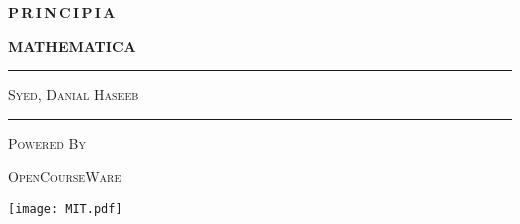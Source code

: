 \documentclass[../main]{subfiles}
\begin{document}
\begin{titlingpage}
  {\Huge \textbf{P\,R\,I\,N\,C\,I\,P\,I\,A}}
  
  \vspace*{\parskip}

  {
    \huge
    \textbf{MATHEMATICA}}\\[\parskip]
    \rule{\textwidth}{\heavyrulewidth
  }
  \vspace*{2em}

  \color{MITgray} {\LARGE \textsc{Syed, Danial Haseeb}}

  \vfill

  \rule{\textwidth}{\normalrulethickness}
  
  {\large \textsc{Powered By}}
  \vspace{1em}
  
  \color{MITred} \textsc{OpenCourseWare}

  \texttt{[image: MIT.pdf]}
\end{titlingpage}
\end{document}
